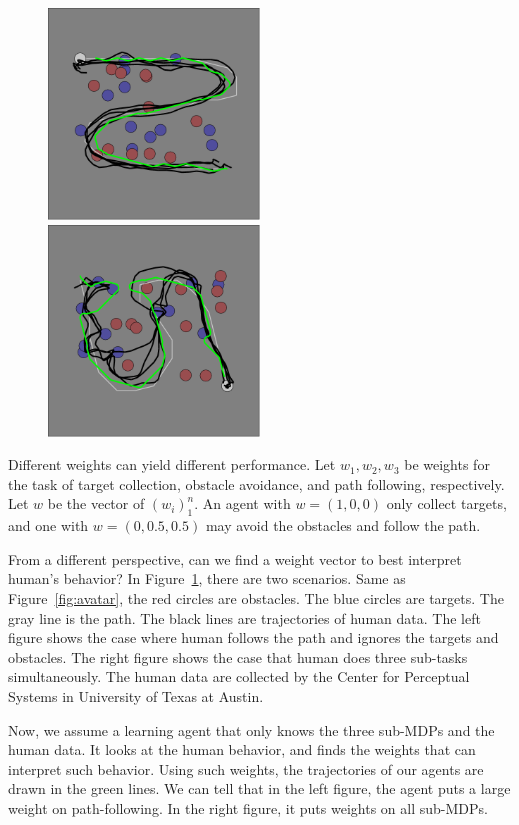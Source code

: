 \documentclass[11pt]{article} %
\begin{document}
\begin{figure}[h!]
\includegraphics[width=0.5\textwidth]{task_1_room_2.png}
\includegraphics[width=0.5\textwidth]{task_4_room_25.png}
\caption{}
\label{fig:exp}
\end{figure}

Different weights can yield different performance. Let $w_1, w_2, w_3$ be
weights for the task of target collection, obstacle avoidance, and path
following, respectively. Let $w$ be the vector of $(w_i)_1^n$. An agent with $w
= (1, 0, 0)$ only collect targets, and one with $w = (0, 0.5, 0.5)$ may avoid
the obstacles and follow the path.

From a different perspective, can we find a weight vector to best interpret
human's behavior? In Figure~\ref{fig:exp}, there are two scenarios. Same as
Figure~\ref{fig:avatar}, the red circles are obstacles. The blue circles are
targets. The gray line is the path. The black lines are trajectories of human
data. The left figure shows the case where human follows the path and ignores
the targets and obstacles. The right figure shows the case that human does three
sub-tasks simultaneously. The human data are collected by the Center for
Perceptual Systems in University of Texas at Austin.

Now, we assume a learning agent that only knows the three sub-MDPs and the human
data. It looks at the human behavior, and finds the weights that can interpret
such behavior. Using such weights, the trajectories of our agents are drawn in
the green lines. We can tell that in the left figure, the agent puts a large
weight on path-following. In the right figure, it puts weights on all sub-MDPs.



\end{document}
